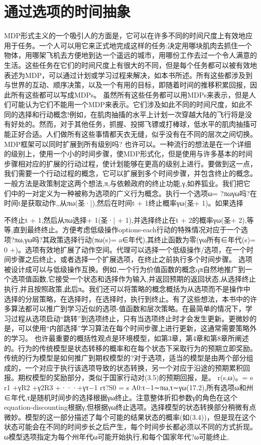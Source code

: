 \section{通过选项的时间抽象}

MDP形式主义的一个吸引人的方面是，它可以在许多不同的时间尺度上有效地应用于任务。一个人可以用它来正式地完成这样的任务:决定用哪块肌肉去抓住一个物体，用哪架飞机去方便地到达一个遥远的城市，用哪份工作去过一个令人满意的生活。这些任务在它们的时间尺度上有很大的不同，但是每个任务都可以被有效地表述为MDP，可以通过计划或学习过程来解决，如本书所述。所有这些都涉及到与世界的互动、顺序决策，以及一个有用的目标，即随着时间的推移积累回报，因此所有这些都可以写成MDPs。
虽然所有这些任务都可以用MDPs来表示，但是人们可能认为它们不能用一个MDP来表示。它们涉及如此不同的时间尺度，如此不同的选择和行动概念!例如，在肌肉抽搐的水平上计划一次穿越大陆的飞行将是没有好处的。然而，对于其他任务，抓握、投掷飞镖或打棒球，低水平的肌肉抽搐可能正好合适。人们做所有这些事情都天衣无缝，似乎没有在不同的层次之间切换。MDP框架可以同时扩展到所有级别吗?
也许可以。一种流行的想法是在一个详细的级别上，使用一个小的时间步骤，使MDP形式化，但是使用与许多基本的时间步骤相对应的扩展的行动过程，使计划能够在更高的级别上进行。要做到这一点，我们需要一个行动过程的概念，它可以扩展到多个时间步骤，并包含终止的概念。一般方法是政策制定这两个想法,π,与依赖政府的终止功能,γ,如养狐业。我们把它们中的一对定义为一种被称为选项的广义行为概念。执行一个选项ω= ?πωγω吗?在时间t是获取动作,,从πω(圣·|),然后在时间t + 1终止概率γω(圣+ 1)。如果选择

不终止t + 1,然后从πω选择+ 1(圣·| + 1),并选择终止在t + 2的概率γω(圣+ 2),等等,直到最终终止。方便考虑低级操作options-each行动的特殊情况对应于一个选项?πω,γω吗?其政策选择行动(πω(s)= a∈年代),其终止函数为零(γω所有∈年代(s)= 0 +)。选项有效地扩展了动作空间。代理可以选择一个低级操作/选项，在一个时间步骤之后终止，或者选择一个扩展选项，在终止之前执行多个时间步骤。
选项被设计成可以与低级操作互换。例如,一个行为价值函数的概念qπ自然地推广到一个选项值函数,它接受一个状态和选择作为输入,并返回预期的返回状态,从选择终止执行,并且按照政策,此后π。我们还可以将策略的概念概括为从选项而不是操作中选择的分层策略，在选择时，在选择时，执行到终止。有了这些想法，本书中的许多算法都可以推广到学习近似的选项-值函数和层次策略。在最简单的情况下，学习过程从选项启动“跳转”到选项终止，只有当选项终止时才会发生更新。更微妙的是，可以使用“内部选择”学习算法在每个时间步骤上进行更新，这通常需要策略外的学习。
也许最重要的概括性观点是环境模型，如第3章，第4章和第8章所阐述的。行为的传统模型是状态转移的概率和在每个状态下采取行为的预期立即奖励。传统的行为模型是如何推广到期权模型的?对于选项，适当的模型是由两个部分组成的，一个对应于执行该选项导致的状态转换，另一个对应于沿途的预期累积回报。期权模型的奖励部分，类似于国家行动对(3.5)的预期回报，是。
r(s,ω)。= e r1 +γR2 +γ2R3 +···+γτ−1 rτ?S0 = s A0:τ−1∼πω,τ∼γω(17.2),所有选项ω和州∈年代,τ是随机时间步的选择根据γω终止。注意整体折扣参数γ的角色在这个equation-discounting根据γ,但根据γω终止选项。选择模型的状态转换部分稍微有点微妙。模型的这一部分描述了每个可能的结果状态的概率(如(3.4))，但是现在这个状态可能会在不同的时间步长之后产生，每个时间步长都必须以不同的方式折现。ω模型选项指定为每个州年代ω可能开始执行,和每个国家年代?ω可能终止,

